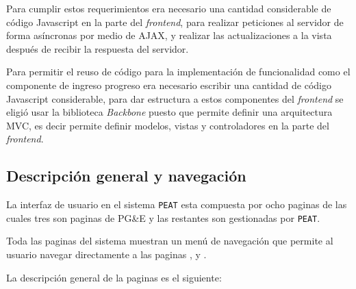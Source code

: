Para cumplir estos requerimientos era necesario una cantidad considerable
de código Javascript en la parte del \textit{frontend}, para realizar peticiones
al servidor de forma asíncronas por medio de AJAX, y realizar las actualizaciones
a la vista después de recibir la respuesta del servidor.

Para permitir el reuso de código para la implementación de funcionalidad como
el componente de ingreso progreso era necesario escribir una cantidad de código
Javascript considerable, para dar estructura a estos componentes del
\textit{frontend} se eligió usar la biblioteca \textit{Backbone} puesto que permite
definir una arquitectura MVC, es decir permite definir modelos, vistas y
controladores en la parte del \textit{frontend}.

\subsection{Descripción general y navegación}

La interfaz de usuario en el sistema \texttt{PEAT} esta compuesta por ocho paginas
de las cuales tres son paginas de PG\&E y las restantes son gestionadas por
\texttt{PEAT}.

Toda las paginas del sistema muestran un menú de navegación que permite al
usuario navegar directamente a las paginas ,
 y .

La descripción general de la paginas es el siguiente:

